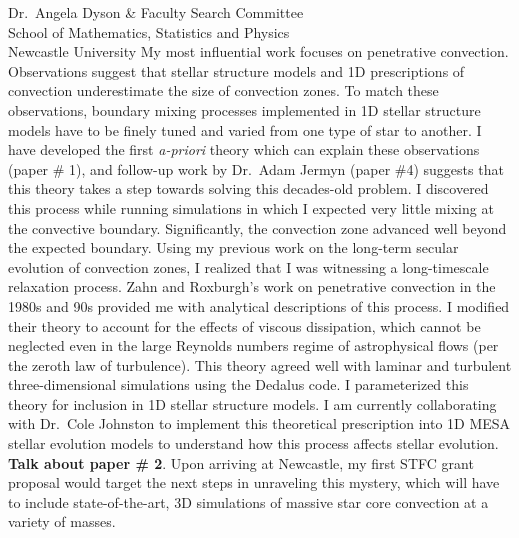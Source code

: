 \documentclass[12pt]{letter}
\begin{document}
\begin{letter}{
        Dr.~Angela Dyson \& Faculty Search Committee \\
        School of Mathematics, Statistics and Physics \\
        Newcastle University}
    My most influential work focuses on penetrative convection.
    Observations suggest that stellar structure models and 1D prescriptions of convection underestimate the size of convection zones.
    To match these observations, boundary mixing processes implemented in 1D stellar structure models have to be finely tuned and varied from one type of star to another.
    I have developed the first \emph{a-priori} theory which can explain these observations (paper \# 1), and follow-up work by Dr.~Adam Jermyn (paper \#4) suggests that this theory takes a step towards solving this decades-old problem.
    I discovered this process while running simulations in which I expected very little mixing at the convective boundary.
    Significantly, the convection zone advanced well beyond the expected boundary.
    Using my previous work on the long-term secular evolution of convection zones, I realized that I was witnessing a long-timescale relaxation process.
    Zahn and Roxburgh's work on penetrative convection in the 1980s and 90s provided me with analytical descriptions of this process.
    I modified their theory to account for the effects of viscous dissipation, which cannot be neglected even in the large Reynolds numbers regime of astrophysical flows (per the zeroth law of turbulence).
    This theory agreed well with laminar and turbulent three-dimensional simulations using the Dedalus code.
    I parameterized this theory for inclusion in 1D stellar structure models.
    I am currently collaborating with Dr.~Cole Johnston to implement this theoretical prescription into 1D MESA stellar evolution models to understand how this process affects stellar evolution.
    \textbf{Talk about paper \# 2}.
    Upon arriving at Newcastle, my first STFC grant proposal would target the next steps in unraveling this mystery, which will have to include state-of-the-art, 3D simulations of massive star core convection at a variety of masses.


\end{letter}
\end{document}
